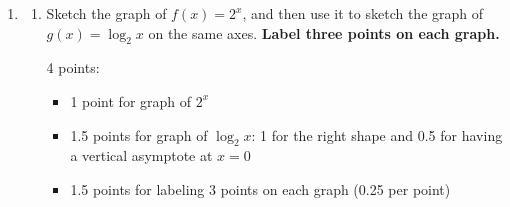 \documentclass{article}
\begin{document}
\begin{enumerate}
\begin{enumerate}
    \begin{solution}
      $\log_k (k^x k^y)$ is the number to which we need to
      raise $k$ to get $k^x k^y$. We can rewrite $k^x k^y$ as 
      $k^{x+y}$. So
      $\log_k (k^x k^y)=\boxed{x+y}$.
    \end{solution}

  \end{enumerate}   

\item  \begin{enumerate}
  \item %

    \begin{problem}[\vfill]
      Sketch the graph of $f(x) = 2^x$, and then use it to sketch the graph of $g(x) = \log_2 x$ on the same axes. {\bf Label three points on each graph.}
    \end{problem}

    \begin{grading} 
      4 points:
      \begin{itemize}[nosep]
      \item 1 point for graph of $2^x$
      \item 1.5 points for graph of $\log_2 x$: 1 for the right shape and 0.5 for having a vertical asymptote at $x = 0$
      \item 1.5 points for labeling 3 points on each graph (0.25 per point) 
      \end{itemize}
    \end{grading} 

    \begin{solution} 
      \begin{center}
      \end{center}
    \end{solution} 


\end{enumerate}
\end{enumerate}
\end{document}
